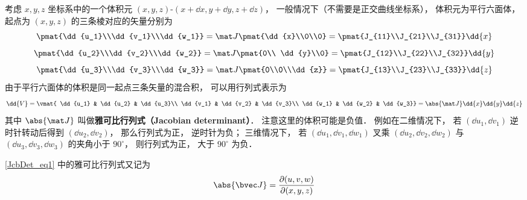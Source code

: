 考虑 $x,y,z$ 坐标系中的一个体积元 $(x,y,z)$-$(x+ \dd{x}, y + \dd{y}, z + \dd{z})$，  一般情况下（不需要是正交曲线坐标系）， 体积元为平行六面体， 起点为 $(x,y,z)$  的三条棱对应的矢量分别为
\begin{equation}
\pmat{\dd{u_1}\\\dd{v_1}\\\dd{w_1}} = 
\mat J\pmat{\dd{x}\\0\\0} = 
\pmat{J_{11}\\J_{21}\\J_{31}} \dd{x}
\end{equation} 
\begin{equation}
\pmat{\dd{u_2}\\\dd{v_2}\\\dd{w_2}} = 
\mat J \pmat{0\\ \dd{y}\\0} = 
\pmat{J_{12}\\J_{22}\\J_{32}} \dd{y}
\end{equation} 
\begin{equation}
\pmat{\dd{u_3}\\\dd{v_3}\\\dd{w_3}} = 
\mat J \pmat{0\\0\\\dd{z}} = 
\pmat{J_{13}\\J_{23}\\J_{33}} \dd{z}
\end{equation} 
由于平行六面体的体积是同一起点三条矢量的混合积， 可以用行列式表示为
\begin{equation}\label{JcbDet_eq1}
\dd{V}
= \vmat{
\dd{u_1} & \dd{u_2} & \dd{u_3}\\
\dd{v_1} & \dd{v_2} & \dd{v_3}\\
\dd{w_1} & \dd{w_2} & \dd{w_3}}
= \abs{\mat J} \dd{x}\dd{y}\dd{z}
\end{equation}
其中 $\abs{\mat J}$  叫做\textbf{雅可比行列式（Jacobian determinant）}． 注意这里的体积可能是负值． 例如在二维情况下， 若 $(\dd{u_1},\dd{v_1})$ 逆时针转动后得到 $(\dd{u_2},\dd{v_2})$， 那么行列式为正， 逆时针为负； 三维情况下， 若 $(\dd{u_1},\dd{v_1},\dd{w_1})$ 叉乘 $(\dd{u_2},\dd{v_2},\dd{w_2})$ 与 $(\dd{u_3},\dd{v_3},\dd{w_3})$ 的夹角小于 $90^\circ$， 则行列式为正， 大于 $90^\circ$ 为负．

\autoref{JcbDet_eq1} 中的雅可比行列式又记为
\begin{equation}
\abs{\bvec J} =  \frac{\partial(u,v,w)}{\partial(x,y,z)}
\end{equation}
